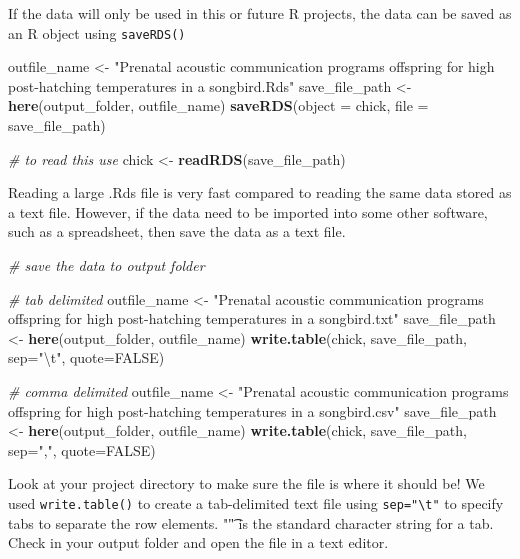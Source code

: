 \documentclass[]{book}
\newenvironment{Shaded}{\begin{snugshade}}{\end{snugshade}}
\newcommand{\CharTok}[1]{\textcolor[rgb]{0.31,0.60,0.02}{#1}}
\newcommand{\CommentTok}[1]{\textcolor[rgb]{0.56,0.35,0.01}{\textit{#1}}}
\newcommand{\DataTypeTok}[1]{\textcolor[rgb]{0.13,0.29,0.53}{#1}}
\newcommand{\KeywordTok}[1]{\textcolor[rgb]{0.13,0.29,0.53}{\textbf{#1}}}
\newcommand{\NormalTok}[1]{#1}
\newcommand{\OtherTok}[1]{\textcolor[rgb]{0.56,0.35,0.01}{#1}}
\newcommand{\StringTok}[1]{\textcolor[rgb]{0.31,0.60,0.02}{#1}}
\begin{document}
If the data will only be used in this or future R projects, the data can be saved as an R object using \texttt{saveRDS()}

\begin{Shaded}
\begin{Highlighting}[]
\NormalTok{outfile_name <-}\StringTok{ "Prenatal acoustic communication programs offspring for high post-hatching temperatures in a songbird.Rds"}
\NormalTok{save_file_path <-}\StringTok{ }\KeywordTok{here}\NormalTok{(output_folder, outfile_name)}
\KeywordTok{saveRDS}\NormalTok{(}\DataTypeTok{object =}\NormalTok{ chick, }\DataTypeTok{file =}\NormalTok{ save_file_path)}

\CommentTok{# to read this use}
\NormalTok{chick <-}\StringTok{ }\KeywordTok{readRDS}\NormalTok{(save_file_path)}
\end{Highlighting}
\end{Shaded}

Reading a large .Rds file is very fast compared to reading the same data stored as a text file. However, if the data need to be imported into some other software, such as a spreadsheet, then save the data as a text file.

\begin{Shaded}
\begin{Highlighting}[]
\CommentTok{# save the data to output folder}

\CommentTok{# tab delimited}
\NormalTok{outfile_name <-}\StringTok{ "Prenatal acoustic communication programs offspring for high post-hatching temperatures in a songbird.txt"}
\NormalTok{save_file_path <-}\StringTok{ }\KeywordTok{here}\NormalTok{(output_folder, outfile_name)}
\KeywordTok{write.table}\NormalTok{(chick, save_file_path, }\DataTypeTok{sep=}\StringTok{"}\CharTok{\textbackslash{}t}\StringTok{"}\NormalTok{, }\DataTypeTok{quote=}\OtherTok{FALSE}\NormalTok{)}

\CommentTok{# comma delimited}
\NormalTok{outfile_name <-}\StringTok{ "Prenatal acoustic communication programs offspring for high post-hatching temperatures in a songbird.csv"}
\NormalTok{save_file_path <-}\StringTok{ }\KeywordTok{here}\NormalTok{(output_folder, outfile_name)}
\KeywordTok{write.table}\NormalTok{(chick, save_file_path, }\DataTypeTok{sep=}\StringTok{","}\NormalTok{, }\DataTypeTok{quote=}\OtherTok{FALSE}\NormalTok{)}
\end{Highlighting}
\end{Shaded}

Look at your project directory to make sure the file is where it should be! We used \texttt{write.table()} to create a tab-delimited text file using \texttt{sep="\textbackslash{}t"} to specify tabs to separate the row elements. "\t" is the standard character string for a tab. Check in your output folder and open the file in a text editor.
\end{document}
